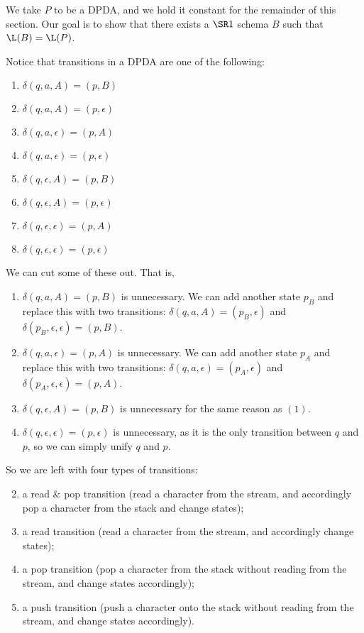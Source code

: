 \documentclass{llncs}
\begin{document}
We take $P$ to be a DPDA, and we hold it constant for the remainder of this section.
Our goal is to show that there exists a $\SR1$ schema $B$ such that $\L(B)=\L(P)$.

Notice that transitions in a DPDA are one of the following:
\begin{enumerate}
    \item $\delta(q,a,A)=(p,B)$
    \item $\delta(q,a,A)=(p,\epsilon)$
    \item $\delta(q,a,\epsilon)=(p,A)$
    \item $\delta(q,a,\epsilon)=(p,\epsilon)$
    \item $\delta(q,\epsilon,A)=(p,B)$
    \item $\delta(q,\epsilon,A)=(p,\epsilon)$
    \item $\delta(q,\epsilon,\epsilon)=(p,A)$
    \item $\delta(q,\epsilon,\epsilon)=(p,\epsilon)$
\end{enumerate}
We can cut some of these out.
That is,
\begin{enumerate}
    \item $\delta(q,a,A)=(p,B)$ is unnecessary.
    We can add another state $p_B$ and replace this with two transitions: $\delta(q,a,A)=(p_B,\epsilon)$ and $\delta(p_B,\epsilon,\epsilon)=(p,B)$.
    \setcounter{enumi}{2}
    \item $\delta(q,a,\epsilon)=(p,A)$ is unnecessary.
    We can add another state $p_A$ and replace this with two transitions: $\delta(q,a,\epsilon)=(p_A,\epsilon)$ and $\delta(p_A,\epsilon,\epsilon)=(p,A)$.
    \setcounter{enumi}{4}
    \item $\delta(q,\epsilon,A)=(p,B)$ is unnecessary for the same reason as $(1)$.
    \setcounter{enumi}{7}
    \item $\delta(q,\epsilon,\epsilon)=(p,\epsilon)$ is unnecessary, as it is the only transition between $q$ and $p$, so we can simply unify $q$ and $p$.
\end{enumerate}
So we are left with four types of transitions:
\begin{enumerate}
        \setcounter{enumi}{1}
    \item a read \& pop transition (read a character from the stream, and accordingly pop a character from the stack and change states);
        \setcounter{enumi}{3}
    \item a read transition (read a character from the stream, and accordingly change states);
        \setcounter{enumi}{5}
    \item a pop transition (pop a character from the stack without reading from the stream, and change states accordingly);
    \item a push transition (push a character onto the stack without reading from the stream, and change states accordingly).
\end{enumerate}
\end{document}
